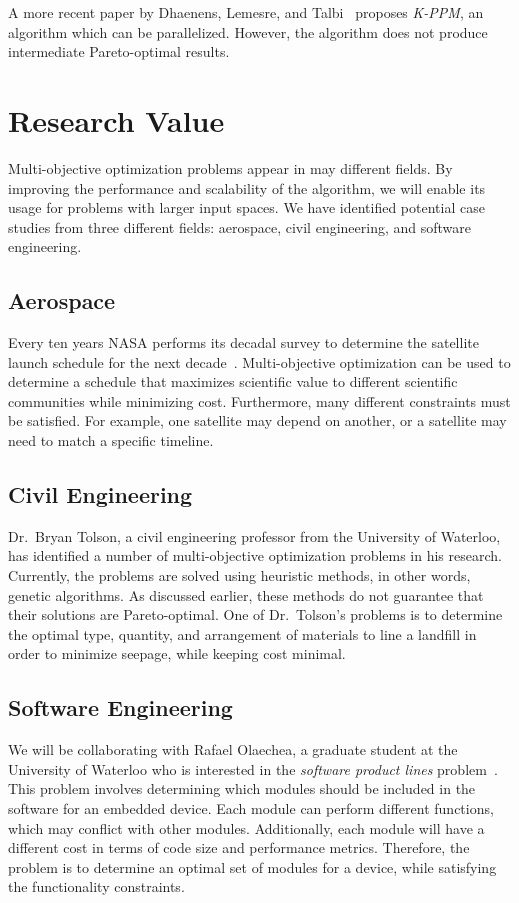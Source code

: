 \documentclass[11pt]{article}
\begin{document}
A more recent paper by Dhaenens, Lemesre, and Talbi~\cite{ref:kppm}
proposes \textit{\mbox{K-PPM}}, an algorithm which can be parallelized.
However, the algorithm does not produce intermediate Pareto-optimal
results.

\section{Research Value}
Multi-objective optimization problems appear in may different fields.
By improving the performance and scalability of the algorithm, we will
enable its usage for problems with larger input spaces. We have
identified potential case studies from three different fields:
aerospace, civil engineering, and software engineering.

\subsection{Aerospace}
Every ten years NASA performs its decadal survey to determine the
satellite launch schedule for the next decade~\cite{ref:nasa11}.
Multi-objective optimization can be used to determine a schedule that
maximizes scientific value to different scientific communities while
minimizing cost. Furthermore, many different constraints must be
satisfied. For example, one satellite may depend on another, or a
satellite may need to match a specific timeline.

\subsection{Civil Engineering}
Dr.\ Bryan Tolson, a civil engineering professor from the University of
Waterloo, has identified a number of multi-objective optimization
problems in his research. Currently, the problems are solved using
heuristic methods, in other words, genetic algorithms. As discussed
earlier, these methods do not guarantee that their solutions are
Pareto-optimal. One of Dr.\ Tolson's problems is to determine the
optimal type, quantity, and arrangement of materials to line a landfill
in order to minimize seepage, while keeping cost minimal.

\subsection{Software Engineering}
We will be collaborating with Rafael Olaechea, a graduate student at
the University of Waterloo who is interested in the \textit{software
product lines} problem~\cite{ref:Olaechea12}. This problem involves
determining which modules should be included in the software for an
embedded device. Each module can perform different functions, which may
conflict with other modules. Additionally, each module will have a
different cost in terms of code size and performance metrics.
Therefore, the problem is to determine an optimal set of modules for a
device, while satisfying the functionality constraints.
\end{document}
